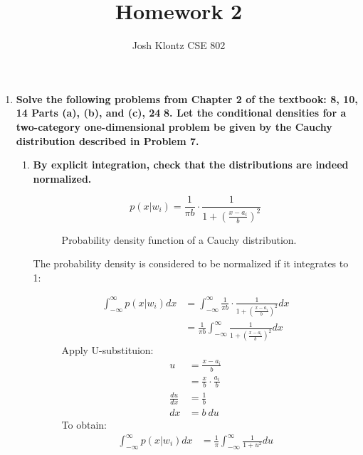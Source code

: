 \documentclass[12pt]{article}
\begin{document}
 
\title{Homework 2}
\author{Josh Klontz
CSE 802}
 
\maketitle

\begin{enumerate}
\item \textbf{Solve the following problems from Chapter 2 of the textbook: 8, 10, 14 Parts (a), (b), and (c), 24}
  \subitem \textbf{8. Let the conditional densities for a two-category one-dimensional problem be given by the Cauchy distribution described in Problem 7.}
  \begin{enumerate}
  \item \textbf{By explicit integration, check that the distributions are indeed normalized.}
    \begin{figure}[H]
    \begin{equation}
      p(x|w_i) = \frac{1}{\pi b} \cdot \frac{1}{1 + (\frac{x-a_i}{b})^2}
    \end{equation}
    \caption{Probability density function of a Cauchy distribution.}
    \end{figure}
    The probability density is considered to be normalized if it integrates to 1:
    \begin{figure}[H]
    \begin{equation}
    \begin{split}
      \int_{-\infty}^{\infty} p(x|w_i) dx& = \int_{-\infty}^{\infty} \frac{1}{\pi b} \cdot \frac{1}{1 + (\frac{x-a_i}{b})^2} dx \\
      & = \frac{1}{\pi b} \int_{-\infty}^{\infty} \frac{1}{1 + (\frac{x-a_i}{b})^2} dx
    \end{split}
    \end{equation}
    Apply U-substituion:
    \begin{equation}
    \begin{split}
      u& = \frac{x-a_i}{b} \\
      & = \frac{x}{b} \cdot \frac{a_i}{b} \\
    \frac{du}{dx}& = \frac{1}{b} \\
    dx& = b\ du
    \end{split}
    \end{equation}
    To obtain:
    \begin{equation}
    \begin{split}
      \int_{-\infty}^{\infty} p(x|w_i) dx& = \frac{1}{\pi} \int_{-\infty}^{\infty} \frac{1}{1 + u^2} du \\

\end{split}
\end{equation}
\end{figure}
\end{enumerate}
\end{enumerate}
\end{document}
